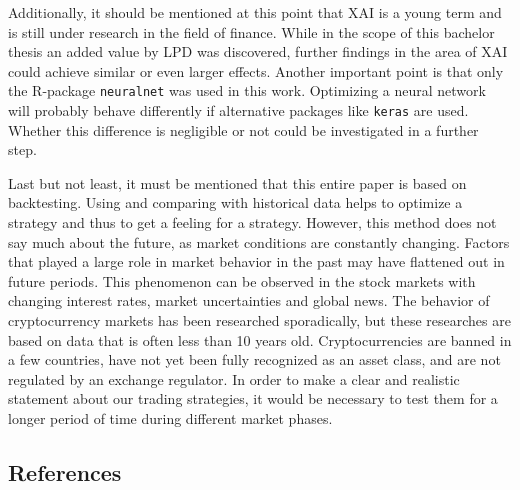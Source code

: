 \documentclass[
]{article}
\begin{document}
Additionally, it should be mentioned at this point that XAI is a young
term and is still under research in the field of finance. While in the
scope of this bachelor thesis an added value by LPD was discovered,
further findings in the area of XAI could achieve similar or even larger
effects. Another important point is that only the R-package
\texttt{neuralnet} was used in this work. Optimizing a neural network
will probably behave differently if alternative packages like
\texttt{keras} are used. Whether this difference is negligible or not
could be investigated in a further step.

Last but not least, it must be mentioned that this entire paper is based
on backtesting. Using and comparing with historical data helps to
optimize a strategy and thus to get a feeling for a strategy. However,
this method does not say much about the future, as market conditions are
constantly changing. Factors that played a large role in market behavior
in the past may have flattened out in future periods. This phenomenon
can be observed in the stock markets with changing interest rates,
market uncertainties and global news. The behavior of cryptocurrency
markets has been researched sporadically, but these researches are based
on data that is often less than 10 years old. Cryptocurrencies are
banned in a few countries, have not yet been fully recognized as an
asset class, and are not regulated by an exchange regulator. In order to
make a clear and realistic statement about our trading strategies, it
would be necessary to test them for a longer period of time during
different market phases.

\newpage

\hypertarget{references}{%
\subsection{References}\label{references}}
\end{document}
